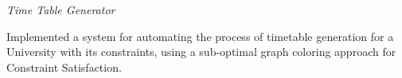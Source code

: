 \documentclass[10pt]{article}
\newcommand{\spc}{\vspace{2mm}}
\begin{document}
\textit{Time Table Generator}
\begin{compactitem}
\item Implemented a system for automating the process of timetable generation for a University with its constraints, using a sub-optimal graph coloring approach for Constraint Satisfaction.
\end{compactitem}
\spc
\end{document}
